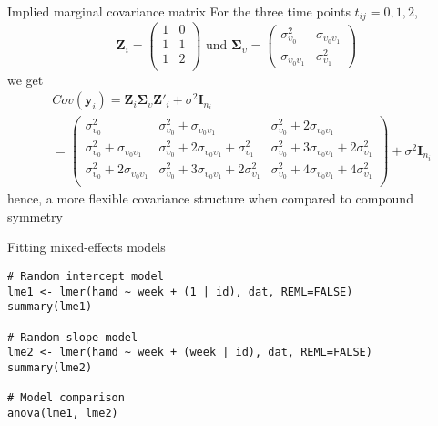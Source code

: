 \documentclass[aspectratio=169]{beamer}
\newcommand{\vect}[1]{\mathbf{#1}}
\newcommand{\mat}[1]{\mathbf{#1}}
\newcommand{\gmat}[1]{\boldsymbol{#1}}
\begin{document}
\begin{frame}{Implied marginal covariance matrix}
For the three time points $t_{ij} = 0, 1, 2$,
\[
  \mat{Z}_i =
    \begin{pmatrix}
      1 & 0 \\
      1 & 1 \\
      1 & 2 \\
    \end{pmatrix}
  \text{ und }
  \gmat{\Sigma}_\upsilon =
    \begin{pmatrix}
      \sigma^2_{\upsilon_0} & \sigma_{\upsilon_0 \upsilon_1} \\
      \sigma_{\upsilon_0 \upsilon_1} & \sigma^2_{\upsilon_1}
    \end{pmatrix}
\]
we get
\begin{align*}
  & Cov(\vect{y}_i) =
    \mat{Z}_i \gmat{\Sigma}_\upsilon \mat{Z}'_i + \sigma^2 \mat{I}_{n_i} \\
  &= \begin{pmatrix}
    \sigma^2_{\upsilon_0}                                    & \sigma^2_{\upsilon_0} + \sigma_{\upsilon_0 \upsilon_1}                             & \sigma^2_{\upsilon_0} + 2 \sigma_{\upsilon_0 \upsilon_1} \\
    \sigma^2_{\upsilon_0} + \sigma_{\upsilon_0 \upsilon_1}   & \sigma^2_{\upsilon_0} + 2 \sigma_{\upsilon_0 \upsilon_1} + \sigma^2_{\upsilon_1}   & \sigma^2_{\upsilon_0} + 3 \sigma_{\upsilon_0 \upsilon_1} + 2 \sigma^2_{\upsilon_1} \\
    \sigma^2_{\upsilon_0} + 2 \sigma_{\upsilon_0 \upsilon_1} & \sigma^2_{\upsilon_0} + 3 \sigma_{\upsilon_0 \upsilon_1} + 2 \sigma^2_{\upsilon_1} & \sigma^2_{\upsilon_0} + 4 \sigma_{\upsilon_0 \upsilon_1} + 4 \sigma^2_{\upsilon_1} \\
  \end{pmatrix}
   + \sigma^2 \mat{I}_{n_i}
\end{align*}
hence, a more flexible covariance structure when compared to compound
  symmetry
\end{frame}

{

\begin{frame}[fragile]{Fitting mixed-effects models}
\begin{lstlisting}
# Random intercept model
lme1 <- lmer(hamd ~ week + (1 | id), dat, REML=FALSE)
summary(lme1)

# Random slope model
lme2 <- lmer(hamd ~ week + (week | id), dat, REML=FALSE)
summary(lme2)

# Model comparison
anova(lme1, lme2)
\end{lstlisting}
\end{frame}

}
\end{document}
